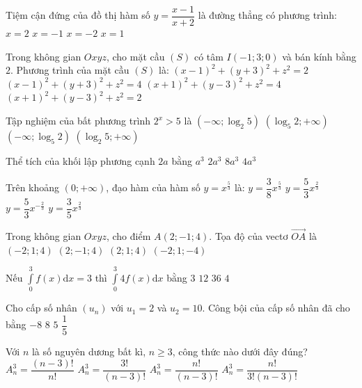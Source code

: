 \begin{ex}%
Tiệm cận đứng của đồ thị hàm số $y=\dfrac{x-1}{x+2}$ là đường thẳng có phương trình:
\choice
{$x=2$}
{$x=-1$}
{\True $x=-2$}
{$x=1$}

\end{ex}
\begin{ex}%
Trong không gian $O x y z$, cho mặt cầu $(S)$ có tâm $I(-1; 3; 0)$ và bán kính bằng $2$. Phương trình của mặt cầu $(S)$ là:
\choice
{$(x-1)^2+(y+3)^2+z^2=2$}
{$(x-1)^2+(y+3)^2+z^2=4$}
{\True $(x+1)^2+(y-3)^2+z^2=4$}
{$(x+1)^2+(y-3)^2+z^2=2$}

\end{ex}
\begin{ex}%
Tập nghiệm của bất phương trình $2^{x}>5$ là
\choice
{$\left(-\infty; \log_2 5\right)$}
{$\left(\log_5 2;+\infty\right)$}
{$\left(-\infty; \log_5 2\right)$}
{\True $\left(\log_2 5;+\infty\right)$}

\end{ex}
\begin{ex}%
Thể tích của khối lập phương cạnh $2a$ bằng
\choice
{$a^3$}
{$2 a^3$}
{\True $8 a^3$}
{$4 a^3$}

\end{ex}
\begin{ex}%
Trên khoảng $(0;+\infty)$, đạo hàm của hàm số $y=x^{\frac{5}{3}}$ là:
\choice
{$y=\dfrac{3}{8} x^{\frac{5}{3}}$}
{\True $y=\dfrac{5}{3} x^{\frac{2}{3}}$}
{$y=\dfrac{5}{3} x^{-\frac{2}{3}}$}
{$y=\dfrac{3}{5} x^{\frac{2}{3}}$}

\end{ex}
\begin{ex}%
Trong không gian $O x y z$, cho điểm $A(2;-1; 4)$. Tọa độ của vectơ $\overrightarrow{OA}$ là
\choice
{$(-2; 1; 4)$}
{\True $(2;-1; 4)$}
{$(2; 1; 4)$}
{$(-2; 1;-4)$}

\end{ex}
\begin{ex}%
Nếu $\displaystyle\int\limits_0^3 f(x) \mathrm{d} x=3$ thì $\displaystyle\int\limits_0^3 4 f(x) \mathrm{d} x$ bằng
\choice
{$3$}
{\True $12$}
{$36$}
{$4$}

\end{ex}
\begin{ex}%
Cho cấp số nhân $\left(u_n\right)$ với $u_1=2$ và $u_2=10$. Công bội của cấp số nhân đã cho bằng
\choice
{$-8$}
{$8$}
{\True $5$}
{$\dfrac{1}{5}$}

\end{ex}
\begin{ex}%
Với $n$ là số nguyên dương bất kì, $n \geq 3$, công thức nào dưới đây đúng?
\choice
{$A_n^3=\dfrac{(n-3) !}{n !}$}
{$A_n^3=\dfrac{3!}{(n-3) !}$}
{\True $A_n^3=\dfrac{n !}{(n-3) !}$}
{$A_n^3=\dfrac{n !}{3!(n-3) !}$}

\end{ex}
